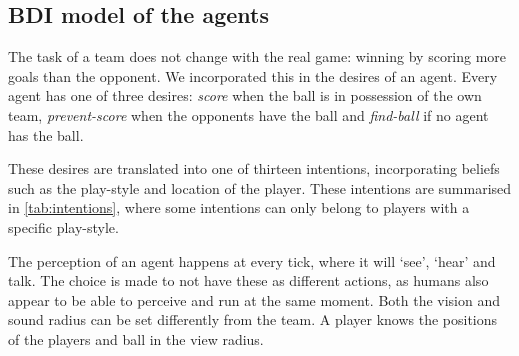 \documentclass{article}
\begin{document}
\subsection{BDI model of the agents}
The task of a team does not change with the real game: winning by scoring more goals than the opponent.
We incorporated this in the desires of an agent.
Every agent has one of three desires: {\em score} when the ball is in possession of the own team, {\em prevent-score} when the opponents have the ball and {\em find-ball} if no agent has the ball.

These desires are translated into one of thirteen intentions, incorporating beliefs such as the play-style and location of the player.
These intentions are summarised in \autoref{tab:intentions}, where some intentions can only belong to players with a specific play-style.

The perception of an agent happens at every tick, where it will `see', `hear' and talk. The choice is made to not have these as different actions, as humans also appear to be able to perceive and run at the same moment. Both the vision and sound radius can be set differently from the team. A player knows the positions of the players and ball in the view radius.
\end{document}

